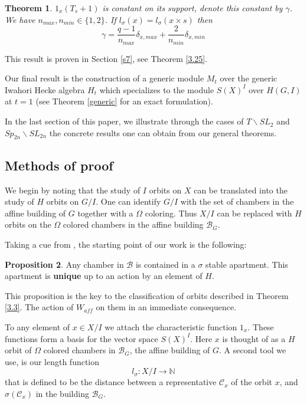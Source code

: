 \documentclass[12pt]{article}
\newcommand{\B}{\mathcal{B}}
\newcommand{\C}{\mathcal{C}}
\newcommand{\<}{\langle}
\renewcommand{\>}{\rangle}
\theoremstyle{plain}
\newtheorem{theorem}{Theorem}[section] %
\theoremstyle{definition}
\newtheorem{prop}[theorem]{Proposition}
\begin{document}
\begin{theorem}\label{1.5}$1_x(T_s+1)$ is constant on its support, denote this constant by $\gamma$.
We have $n_{max},n_{min}\in\{1,2\}$.
If $l_\sigma(x)= l_\sigma(x\times s)$ then $$\gamma=\frac{q-1}{n_{max}}\delta_{x,max}+\frac{2}{n_{min}}\delta_{x,min}$$

\end{theorem}

This result is proven in Section \ref{s7}, see Theorem \ref{3.25}.

Our final result is the construction of a generic module $M_t$ over the generic Iwahori Hecke algebra $H_t$ which specializes to the module $S(X)^I$ over $H(G,I)$ at $t=1$ (see Theorem \ref{generic} for an exact formulation).


In the last section of this paper, we illustrate through the cases of $T\backslash SL_2$ and $Sp_{2n}\backslash SL_{2n}$ the concrete results one can obtain from our general theorems.







\subsection{Methods of proof}


We begin by noting that the study of $I$ orbits on $X$ can be translated into the study of $H$ orbits on $G/I$. One can identify $G/I$ with the set of chambers in the affine building of $G$ together with a $\Omega$ coloring. Thus $X/I$ can be replaced with $H$ orbits on the $\Omega$ colored chambers in the affine building $\B_G$.

Taking a cue from \cite{delorm}, the starting point of our work is the following:

\begin{prop}
Any chamber in $\B$ is contained in a $\sigma$ stable apartment. This apartment is {\bf unique} up to an action by an element of $H$. 
\end{prop}

This proposition is the key to the classification of orbits described in Theorem \ref{3.3}. The action of $W_{aff}$ on them in an immediate consequence.

To any element of  $x \in X/I$ we attach the characteristic function $1_{x}$. These functions form a basis for the vector space $S(X)^I$. Here $x$ is thought of as a $H$ orbit of $\Omega$ colored chambers in $\B_G$, the affine building of $G$.
A second tool we use, is our length function $$l_\sigma:  X/I \to \mathbb{N}$$ that is defined to be the distance between a representative $\C_x$ of the orbit $x$, and $\sigma(\C_x)$ in the building $\B_G$. 
\end{document}
